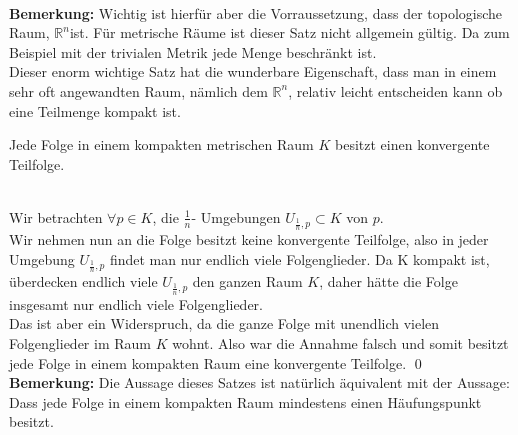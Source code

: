 	\\
	{\bf Bemerkung:} Wichtig ist hierfür aber die Vorraussetzung, dass der topologische Raum, \(\mathbb{R}^n \)ist. Für metrische Räume ist dieser Satz nicht allgemein gültig. 
	Da zum Beispiel mit der trivialen Metrik jede Menge beschränkt ist.\\
	Dieser enorm wichtige Satz hat die wunderbare Eigenschaft, dass man in einem sehr oft angewandten Raum, nämlich dem \(\mathbb{R}^n \), 
	relativ leicht entscheiden kann ob eine Teilmenge kompakt ist. 
	\begin{Satz}
		Jede Folge in einem kompakten metrischen Raum \(K\) besitzt einen konvergente Teilfolge.
	\end{Satz}
	\\
		Wir betrachten \( \forall p \in K \), die \( \frac{1}{n} \)- Umgebungen \( U_{\frac{1}{n},p} \subset K \) von \(p \). \\
		Wir nehmen nun an die Folge besitzt keine konvergente Teilfolge, also in jeder Umgebung  \( U_{\frac{1}{n},p} \) findet man nur endlich viele Folgenglieder. 
		Da K kompakt ist, überdecken endlich viele  \( U_{\frac{1}{n},p} \) den ganzen Raum \( K \), daher hätte die Folge insgesamt nur endlich viele Folgenglieder.\\
		Das ist aber ein Widerspruch, da die ganze Folge mit unendlich vielen Folgenglieder im Raum \(K \) wohnt. Also war die Annahme falsch und somit besitzt jede Folge in einem kompakten
		Raum eine konvergente Teilfolge.
	\qed\\
	{\bf Bemerkung:} Die Aussage dieses Satzes ist natürlich äquivalent mit der Aussage: Dass jede Folge in einem kompakten Raum mindestens einen Häufungspunkt besitzt. 
		
	

